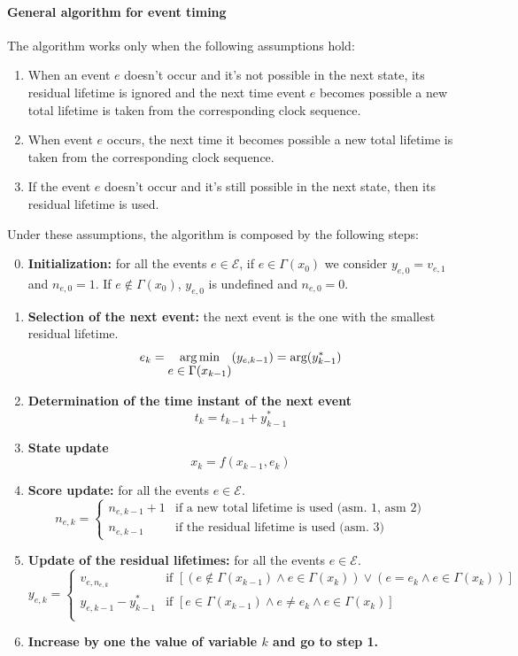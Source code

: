 \documentclass[12pt,a4paper]{article}
\DeclareMathOperator*{\argmin}{arg\,min}
\begin{document}
\paragraph{General algorithm for event timing} The algorithm works only when the following assumptions hold:
\begin{enumerate}
\item When an event $e$ doesn’t occur and it’s not possible in the next state, its residual lifetime is ignored and the next time event $e$ becomes possible a new total lifetime is taken from the corresponding clock sequence.
\item When event $e$ occurs, the next time it becomes possible a new total lifetime is taken from the corresponding clock sequence.
\item If the event $e$ doesn’t occur and it’s still possible in the next state, then its residual lifetime is used.
\end{enumerate}
\noindent
Under these assumptions, the algorithm is composed by the following steps:
\begin{enumerate}
\setcounter{enumi}{-1}
\item \textbf{Initialization:} for all the events $e\in\mathcal{E}$, if $e\in\Gamma(x_0)$ we consider $y_{e,0}=v_{e,1}$ and $n_{e,0}=1$. If $e\notin\Gamma(x_0)$, $y_{e,0}$ is undefined and $n_{e,0}=0$.
\item \textbf{Selection of the next event:} the next event is the one with the smallest residual lifetime.
$$
e_k = \argmin\limits_{\mathlarger{e\in\Gamma(x_{k-1})}} (y_{e,k-1}) = \text{arg} (y_{k-1}^*)
$$
\item \textbf{Determination of the time instant of the next event}
$$
t_k=t_{k-1}+y_{k-1}^*
$$
\item \textbf{State update}
$$
x_{k}=f(x_{k-1},e_{k})
$$
\item \textbf{Score update:}
for all the events $e\in\mathcal{E}$.
$$
n_{e,k}=
\begin{cases}
n_{e,k-1}+1 & \text{if a new total lifetime is used (asm. 1, asm 2)} \\
n_{e,k-1} & \text{if the residual lifetime is used (asm. 3)}
\end{cases}
$$
\item \textbf{Update of the residual lifetimes:}
for all the events $e\in\mathcal{E}$.
$$
y_{e,k}=
\begin{cases}
v_{e,n_{e,k}} & \text{if } \left[\left(e\notin\Gamma(x_{k-1})\wedge e\in\Gamma(x_{k})\right)\vee\left(e=e_{k} \wedge e\in \Gamma(x_{k})\right)\right] \\
y_{e,k-1}-y_{k-1}^{*} & \text{if } \left[e\in\Gamma(x_{k-1})\wedge e\neq e_{k} \wedge e\in\Gamma(x_{k}) \right] \\
\end{cases}
$$
\item \textbf{Increase by one the value of variable $k$ and go to step 1.}
\end{enumerate}
\newpage
\end{document}
